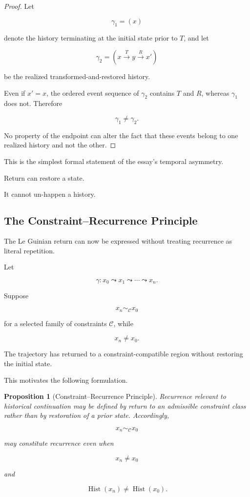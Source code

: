 \documentclass[
  11pt,
  a4paper,
  DIV=12,
  BCOR=0mm,
  parskip=half-
]{scrartcl}
\newcommand{\Hist}{\operatorname{Hist}}
\theoremstyle{definition}
\theoremstyle{plain}
\newtheorem{proposition}[definition]{Proposition}
\theoremstyle{remark}
\begin{document}
\begin{proof}
Let

\[
  \gamma_1=(x)
\]

denote the history terminating at the initial state prior to \(T\), and let

\[
  \gamma_2=(x\xrightarrow{T}y\xrightarrow{R}x')
\]

be the realized transformed-and-restored history.

Even if \(x'=x\), the ordered event sequence of \(\gamma_2\) contains \(T\)
and \(R\), whereas \(\gamma_1\) does not. Therefore

\[
  \gamma_1\neq\gamma_2.
\]

No property of the endpoint can alter the fact that these events belong to
one realized history and not the other.
\end{proof}

This is the simplest formal statement of the essay's temporal asymmetry.

Return can restore a state.

It cannot un-happen a history.


\subsection{The Constraint--Recurrence Principle}
\label{sec:constraint-recurrence}

The Le Guinian return can now be expressed without treating recurrence as
literal repetition.

Let

\[
  \gamma:
  x_0
  \leadsto
  x_1
  \leadsto
  \cdots
  \leadsto
  x_n.
\]

Suppose

\[
  x_n\sim_{\mathcal C}x_0
\]

for a selected family of constraints \(\mathcal C\), while

\[
  x_n\neq x_0.
\]

The trajectory has returned to a constraint-compatible region without
restoring the initial state.

This motivates the following formulation.

\begin{proposition}[Constraint--Recurrence Principle]
\label{prop:constraint-recurrence}
Recurrence relevant to historical continuation may be defined by return to an
admissible constraint class rather than by restoration of a prior state.
Accordingly,

\[
  x_n\sim_{\mathcal C}x_0
\]

may constitute recurrence even when

\[
  x_n\neq x_0
\]

and

\[
  \Hist(x_n)\neq\Hist(x_0).
\]
\end{proposition}
\end{document}
